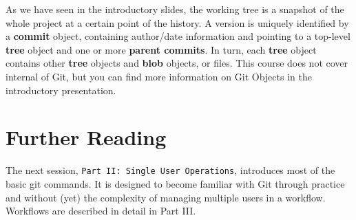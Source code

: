 \documentclass{../../common/tufte-latex/tufte-handout}
\begin{document}
As we have seen in the introductory slides, the working tree is a snapshot of the whole project at a certain point of the history.
A version is uniquely identified by a \textbf{commit} object, containing author/date information and pointing to a top-level \textbf{tree} object and one or more \textbf{parent commits}.
In turn, each \textbf{tree} object contains other \textbf{tree} objects and \textbf{blob} objects, or files.
This course does not cover internal of Git, but you can find more information on Git Objects in the introductory presentation.

\section{Further Reading}

The next session, \texttt{Part II: Single User Operations}, introduces most of the basic git commands. It is designed to become familiar with Git through practice and without (yet) the complexity of managing multiple users in a workflow. Workflows are described in detail in Part III.



\end{document}
